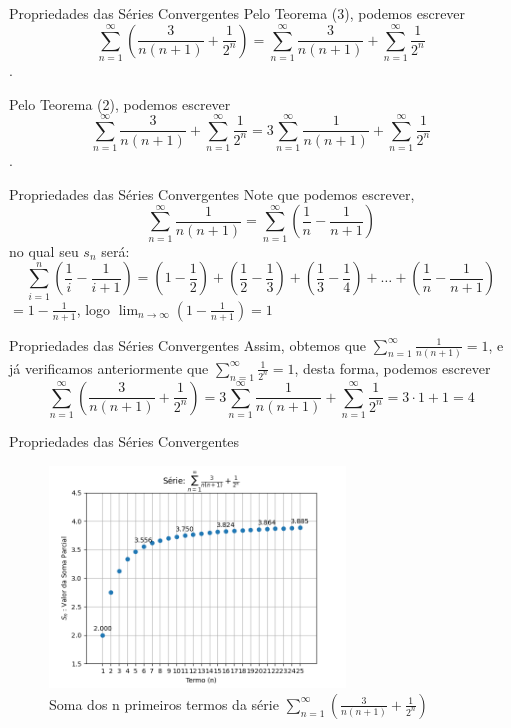 \documentclass[brazil]{beamer}
\begin{document}
	\begin{frame}{Propriedades das Séries Convergentes}
		\justifying
		Pelo Teorema (3), podemos escrever
		$$\displaystyle\sum_{n=1}^{\infty} \left(\frac{3}{n(n + 1)} + \frac{1}{2^n}\right) = \displaystyle\sum_{n=1}^{\infty} \frac{3}{n(n + 1)} + \displaystyle\sum_{n=1}^{\infty} \frac{1}{2^n}$$.
		
		Pelo Teorema (2), podemos escrever $$ \displaystyle\sum_{n=1}^{\infty}
		\frac{3}{n(n + 1)} + \displaystyle\sum_{n=1}^{\infty} \frac{1}{2^n} =
		3\displaystyle\sum_{n=1}^{\infty} \frac{1}{n(n + 1)} +
		\displaystyle\sum_{n=1}^{\infty} \frac{1}{2^n}$$.
	\end{frame}
	
	\begin{frame}{Propriedades das Séries Convergentes}
		Note que podemos escrever,
		$$\displaystyle\sum_{n=1}^{\infty} \frac{1}{n(n + 1)} = \displaystyle\sum_{n=1}^{\infty} \left(\frac{1}{n} - \frac{1}{n + 1}\right)$$
		no qual seu $s_n$ será:
		$$\displaystyle\sum_{i=1}^{n} \left(\frac{1}{i} - \frac{1}{i + 1}\right) = \left(1 - \frac{1}{2}\right) + \left(\frac{1}{2} - \frac{1}{3}\right) + \left(\frac{1}{3} - \frac{1}{4}\right) + \dots + \left(\frac{1}{n} - \frac{1}{n + 1}\right)$$
		$ = 1 - \displaystyle\frac{1}{n + 1} $, logo $\displaystyle\lim_{n \to \infty} \left(1 - \frac{1}{n + 1}\right) = 1$
	\end{frame}
	
	\begin{frame}{Propriedades das Séries Convergentes}
		Assim, obtemos que $\displaystyle\sum_{n=1}^{\infty} \frac{1}{n(n + 1)} = 1$, e já verificamos anteriormente que $\displaystyle\sum_{n=1}^{\infty} \frac{1}{2^n} = 1$, desta forma, podemos escrever
		$$\displaystyle\sum_{n=1}^{\infty} \left(\frac{3}{n(n + 1)} + \frac{1}{2^n}\right) = 3\displaystyle\sum_{n=1}^{\infty} \frac{1}{n(n + 1)} + \displaystyle\sum_{n=1}^{\infty} \frac{1}{2^n} = 3\cdot1 + 1 = 4$$
	\end{frame}
	
	\begin{frame}{Propriedades das Séries Convergentes}
		\begin{figure}
			\centering
			\includegraphics[width=0.7\textwidth]{../images/serie_3.png}
			\caption{Soma dos n primeiros termos da série  $\displaystyle\sum_{n=1}^{\infty} \left(\frac{3}{n(n + 1)} + \frac{1}{2^n}\right)$}
		\end{figure}
	\end{frame}
	
\end{document}
